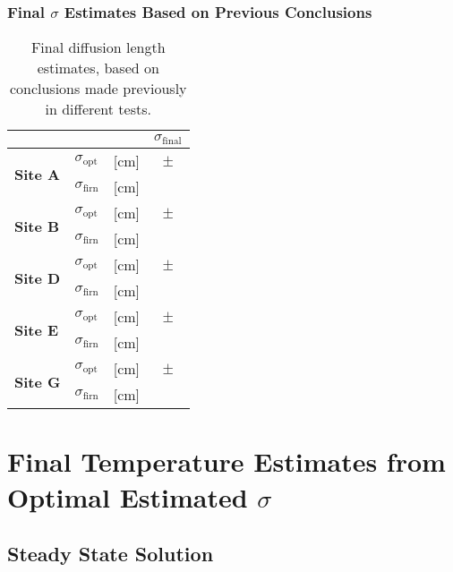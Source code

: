 \documentclass[../../CompleteThesis2/Complete_2ndDraft]{subfiles}
\begin{document}
\subsubsection[Final $\sigma$ Estimates]{Final $\sigma$ Estimates Based on Previous Conclusions}
\label{Subsubsec:Results_DiffLenEst_AlphabetCores_FinalEstimates}
\begin{table}[ht]
	\centering
	\begin{tabular}{l l l | c }
		& & & $\sigma_{\text{final}}$\\
		\hline
		\hline 
		\multirow{2}{*}{\textbf{Site A}} & $\sigma_{\text{opt}}$ & [cm] & $ \pm$ \\
		& $\sigma_{\text{firn}}$ & [cm] & \\
		\hline
		
		\multirow{2}{*}{\textbf{Site B}} & $\sigma_{\text{opt}}$ & [cm] & $ \pm $ \\
		& $\sigma_{\text{firn}}$ & [cm] & \\
		\hline
		
		\multirow{2}{*}{\textbf{Site D}} & $\sigma_{\text{opt}}$ & [cm] & $ \pm $ \\
		& $\sigma_{\text{firn}}$ & [cm] & \\
		\hline
		
		\multirow{2}{*}{\textbf{Site E}} & $\sigma_{\text{opt}}$ & [cm] & $ \pm $ \\
		& $\sigma_{\text{firn}}$ & [cm] & \\
		\hline
		
		\multirow{2}{*}{\textbf{Site G}} & $\sigma_{\text{opt}}$ & [cm] & $ \pm $ \\
		& $\sigma_{\text{firn}}$ & [cm] & \\
		
		\hline
	\end{tabular}
\caption[Final $\sigma$ Estimates]{\small Final diffusion length estimates, based on conclusions made previously in different tests.}
\end{table}






\section[Temperature Estimates from Data]{Final Temperature Estimates from Optimal Estimated $\sigma$}
\label{Sec:Results_TempEstData}


\subsection[Steady State Solution]{Steady State Solution}
\label{Sec:Results_TempEstData_StSt}
\end{document}
